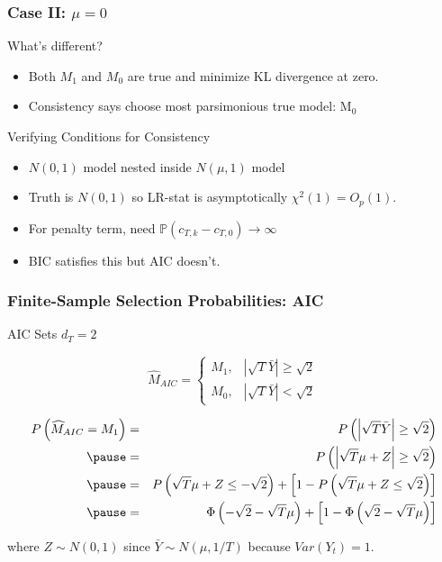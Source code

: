 \begin{frame}
  \frametitle{Case II: $\mu = 0$}

  \begin{block}{What's different?}
  \begin{itemize}
    \item Both $M_1$ and $M_0$ are true and minimize KL divergence at zero. 
    \item \alert{Consistency} says choose most parsimonious true model: $\text{M}_0$
  \end{itemize}
  \end{block}

  \pause

  \begin{block}{Verifying Conditions for Consistency}
    \begin{itemize}
      \item $N(0,1)$ model nested inside $N(\mu,1)$ model
      \item Truth is $N(0,1)$ so LR-stat is asymptotically $\chi^2(1) = O_p(1)$.
      \item For penalty term, need $\mathbb{P}(c_{T,k} - c_{T,0})\rightarrow \infty$
      \item BIC satisfies this but AIC doesn't.
    \end{itemize}
    
  \end{block}
\end{frame}
\begin{frame}
  \frametitle{Finite-Sample Selection Probabilities: AIC}
  \begin{block}{AIC Sets $d_T = 2$}


	$$\widehat{M}_{AIC} = \left\{\begin{array}
		{cc} M_1, &|\sqrt{T}\bar{Y}| \geq \sqrt{2} \\
		M_0, & |\sqrt{T} \bar{Y}| < \sqrt{2}
	\end{array} \right.$$
  \end{block}

  \pause

  \vspace{-2em}

    \footnotesize
	\begin{eqnarray*}
		P\left(\widehat{M}_{AIC} = M_1\right) &=& P\left(\left|\sqrt{T}\bar{Y} \right| \geq \sqrt{2}  \right)\\ \pause
		&=& P\left(\left|\sqrt{T}\mu + Z\right| \geq \sqrt{2}  \right)\\\pause
		&=& P\left(\sqrt{T}\mu + Z \leq -\sqrt{2}\right) + \left[1 - P\left(\sqrt{T} \mu +Z \leq \sqrt{2}\right) \right]\\\pause
			&=& \Phi\left(-\sqrt{2} - \sqrt{T}\mu\right) + \left[1 -  \Phi\left(\sqrt{2} - \sqrt{T} \mu \right)\right]
	\end{eqnarray*}

  \normalsize
where $Z \sim N(0,1)$ since $\bar{Y} \sim N(\mu, 1/T)$ because $Var(Y_t)=1$.
\end{frame}
